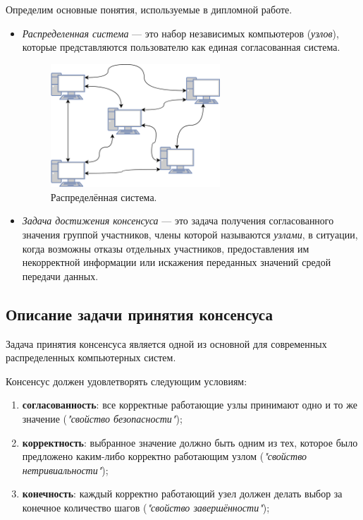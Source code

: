 \documentclass[subf, href, colorlinks=true, 14pt,
times, mtpro, specialist]{disser}
\theoremstyle{definition}
\begin{document}
Определим основные понятия, используемые в дипломной работе.
\begin{itemize}
\item \emph{Распределенная система} --- это набор независимых компьютеров (\emph{узлов}), которые представляются пользователю как единая согласованная система.

\begin{figure}[H]
\label{fig:dist_sys}
\centering
\includegraphics[width=0.6\textwidth]{src/pics/dist_sys.png}
\caption{Распределённая система.}
\end{figure}

\item \emph{Задача достижения консенсуса} --- это задача получения согласованного значения группой участников, члены которой называются \emph{узлами}, в ситуации, когда возможны отказы отдельных участников, предоставления им некорректной информации или искажения переданных значений средой передачи данных.
\end{itemize}



\subsection{Описание задачи принятия консенсуса}

Задача принятия консенсуса является одной из основной для современных распределенных компьютерных систем. 

Консенсус должен удовлетворять следующим условиям:
\begin{enumerate}
\item \textbf{согласованность}: все корректные работающие узлы принимают одно и то же значение (\textit{"свойство безопасности"});
\item \textbf{корректность}: выбранное значение должно быть одним из тех, которое было предложено каким-либо корректно работающим узлом (\textit{"свойство нетривиальности"});
\item \textbf{конечность}: каждый корректно работающий узел должен делать выбор за конечное количество шагов (\textit{"свойство завершённости"});
\end{enumerate}
\end{document}
